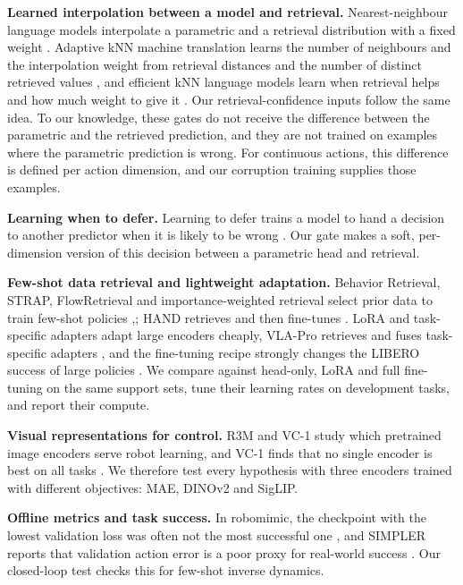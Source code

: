 \documentclass[10pt,twocolumn,letterpaper]{article}
\begin{document}
\textbf{Learned interpolation between a model and retrieval.} Nearest-neighbour language models interpolate a parametric and a retrieval distribution with a fixed weight \cite{ref8}. Adaptive kNN machine translation learns the number of neighbours and the interpolation weight from retrieval distances and the number of distinct retrieved values \cite{ref22}, and efficient kNN language models learn when retrieval helps and how much weight to give it \cite{ref23}. Our retrieval-confidence inputs follow the same idea. To our knowledge, these gates do not receive the difference between the parametric and the retrieved prediction, and they are not trained on examples where the parametric prediction is wrong. For continuous actions, this difference is defined per action dimension, and our corruption training supplies those examples.

\textbf{Learning when to defer.} Learning to defer trains a model to hand a decision to another predictor when it is likely to be wrong \cite{ref24,ref25}. Our gate makes a soft, per-dimension version of this decision between a parametric head and retrieval.

\textbf{Few-shot data retrieval and lightweight adaptation.} Behavior Retrieval, STRAP, FlowRetrieval and importance-weighted retrieval select prior data to train few-shot policies \cite{ref26,ref27},\cite{ref28,ref29}; HAND retrieves and then fine-tunes \cite{ref30}. LoRA \cite{ref31} and task-specific adapters \cite{ref32} adapt large encoders cheaply, VLA-Pro retrieves and fuses task-specific adapters \cite{ref33}, and the fine-tuning recipe strongly changes the LIBERO success of large policies \cite{ref34}. We compare against head-only, LoRA and full fine-tuning on the same support sets, tune their learning rates on development tasks, and report their compute.

\textbf{Visual representations for control.} R3M and VC-1 study which pretrained image encoders serve robot learning, and VC-1 finds that no single encoder is best on all tasks \cite{ref35,ref36}. We therefore test every hypothesis with three encoders trained with different objectives: MAE, DINOv2 and SigLIP.

\textbf{Offline metrics and task success.} In robomimic, the checkpoint with the lowest validation loss was often not the most successful one \cite{ref37}, and SIMPLER reports that validation action error is a poor proxy for real-world success \cite{ref38}. Our closed-loop test checks this for few-shot inverse dynamics.
\end{document}
